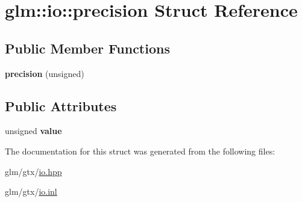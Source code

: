 \hypertarget{structglm_1_1io_1_1precision}{\section{glm\-:\-:io\-:\-:precision Struct Reference}
\label{structglm_1_1io_1_1precision}
}
\subsection*{Public Member Functions}
\begin{DoxyCompactItemize}
\item 
\hypertarget{structglm_1_1io_1_1precision_aa359e1766fd74b88e049d5449d521447}{{\bfseries precision} (unsigned)}\label{structglm_1_1io_1_1precision_aa359e1766fd74b88e049d5449d521447}

\end{DoxyCompactItemize}
\subsection*{Public Attributes}
\begin{DoxyCompactItemize}
\item 
\hypertarget{structglm_1_1io_1_1precision_a43da772dff9a209768c63f1220d52074}{unsigned {\bfseries value}}\label{structglm_1_1io_1_1precision_a43da772dff9a209768c63f1220d52074}

\end{DoxyCompactItemize}


The documentation for this struct was generated from the following files\-:\begin{DoxyCompactItemize}
\item 
glm/gtx/\hyperlink{io_8hpp}{io.\-hpp}\item 
glm/gtx/\hyperlink{io_8inl}{io.\-inl}\end{DoxyCompactItemize}
